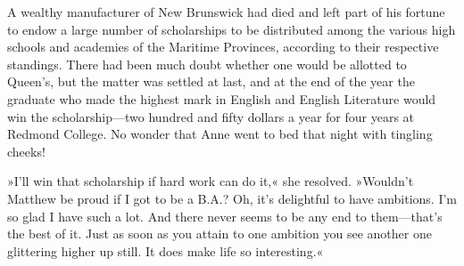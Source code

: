 A wealthy manufacturer of New Brunswick had died and left part of his fortune to endow a large number of scholarships to be distributed among the various high schools and academies of the Maritime Provinces, according to their respective standings. There had been much doubt whether one would be allotted to Queen’s, but the matter was settled at last, and at the end of the year the graduate who made the highest mark in English and English Literature would win the scholarship—two hundred and fifty dollars a year for four years at Redmond College. No wonder that Anne went to bed that night with tingling cheeks!

»I’ll win that scholarship if hard work can do it,« she resolved. »Wouldn’t Matthew be proud if I got to be a B.A.? Oh, it’s delightful to have ambitions. I’m so glad I have such a lot. And there never seems to be any end to them—that’s the best of it. Just as soon as you attain to one ambition you see another one glittering higher up still. It does make life so interesting.«